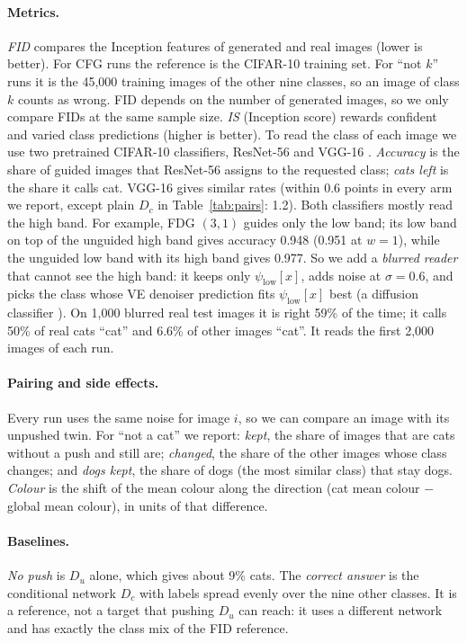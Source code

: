 \documentclass[11pt]{article}
\newcommand{\low}{\psi_{\mathrm{low}}}
\begin{document}
\paragraph{Metrics.} \emph{FID} \cite{fid} compares the Inception features of generated and real images (lower is
better). For CFG runs the reference is the CIFAR-10 training set. For ``not $k$'' runs it is the 45,000 training
images of the other nine classes, so an image of class $k$ counts as wrong. FID depends on the number of generated
images, so we only compare FIDs at the same sample size. \emph{IS} \cite{is} (Inception score) rewards confident and
varied class predictions (higher is better). To read the class of each image we use two pretrained CIFAR-10
classifiers, ResNet-56 and VGG-16 \cite{chenyao}. \emph{Accuracy} is the share of guided images that ResNet-56
assigns to the requested class; \emph{cats left} is the share it calls cat. VGG-16 gives similar rates (within
0.6 points in every arm we report, except plain $D_c$ in Table~\ref{tab:pairs}: 1.2). Both classifiers mostly read the high band. For example, FDG $(3,1)$ guides only the low band;
its low band on top of the unguided high band gives accuracy 0.948 (0.951 at $w = 1$), while the unguided low band
with its high band gives 0.977. So we add a \emph{blurred reader} that cannot see the high band: it keeps only $\low[x]$, adds noise at $\sigma = 0.6$, and picks the class whose VE denoiser
prediction fits $\low[x]$ best (a diffusion classifier \cite{diffclf}). On 1,000 blurred real test images it is right
59\% of the time; it calls 50\% of real cats ``cat'' and 6.6\% of other images ``cat''. It reads the first 2,000
images of each run.

\paragraph{Pairing and side effects.} Every run uses the same noise for image $i$, so we can compare an image with
its unpushed twin. For ``not a cat'' we report: \emph{kept}, the share of images that are cats without a push and
still are; \emph{changed}, the share of the other images whose class changes; and \emph{dogs kept}, the share of
dogs (the most similar class) that stay dogs. \emph{Colour} is the shift of the mean colour along the direction
(cat mean colour $-$ global mean colour), in units of that difference.

\paragraph{Baselines.} \emph{No push} is $D_u$ alone, which gives about 9\% cats. The \emph{correct answer} is
the conditional network $D_c$ with labels spread evenly over the nine other classes. It is a reference, not a target
that pushing $D_u$ can reach: it uses a different network and has exactly the class mix of the FID reference.
\end{document}
